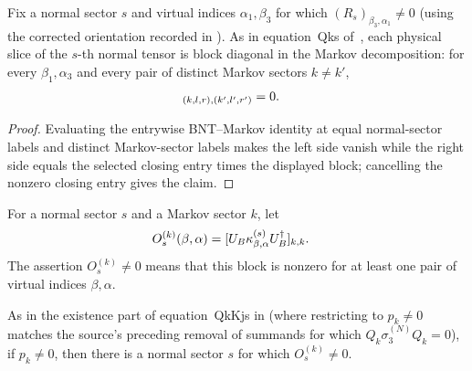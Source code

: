 \begin{lemma}
    \label{thm:mpdo_bnt_markov_offdiagonal}
    \leanok
    Fix a normal sector $s$ and virtual indices $\alpha_1,\beta_3$ for which
    ${(R_s)}_{\beta_3,\alpha_1}\ne0$ (using the corrected orientation recorded
    in \cite{gap:cpgsv17_mpdo_sal_zcl_eta_local_structure}). As in
    equation~\textup{Qks} of~\cite[Appendix~C.2, lines~1682--1688 and 1730--1735]
    {Cirac2016MPDO_arXiv}, each physical slice of the $s$-th normal tensor is
    block diagonal in the Markov decomposition: for every $\beta_1,\alpha_3$
    and every pair of distinct Markov sectors $k\ne k'$,
    \begin{align}
        [U_B\kappa^{(s)}_{\beta_1,\alpha_3}U_B^\dagger]_
        {(k,l,r),(k',l',r')}
         & =0.
        \notag
    \end{align}
\end{lemma}

\begin{proof}\leanok
    Evaluating the entrywise BNT--Markov identity at equal normal-sector
    labels and distinct Markov-sector labels makes the left side vanish while
    the right side equals the selected closing entry times the displayed
    block; cancelling the nonzero closing entry gives the claim.
\end{proof}

\begin{definition}
    \label{def:mpdo_bnt_markov_block}
    \leanok
    For a normal sector $s$ and a Markov sector $k$, let
    \begin{align}
        O_s^{(k)}(\beta,\alpha)
         & =
        [U_B\kappa^{(s)}_{\beta,\alpha}U_B^\dagger]_{k,k}.
        \notag
    \end{align}
    The assertion $O_s^{(k)}\ne0$ means that this block is nonzero for at
    least one pair of virtual indices $\beta,\alpha$.
\end{definition}

\begin{lemma}
    \label{thm:mpdo_bnt_markov_label_exists}
    \leanok
    As in the existence part of equation~\textup{QkKjs} in
    \cite[Appendix~C.2, lines~1733--1737]{Cirac2016MPDO_arXiv} (where
    restricting to $p_k\ne0$ matches the source's preceding removal of summands
    for which $Q_k\sigma_3^{(N)}Q_k=0$), if $p_k\ne0$, then there is a normal
    sector $s$ for which $O_s^{(k)}\ne0$.
\end{lemma}

